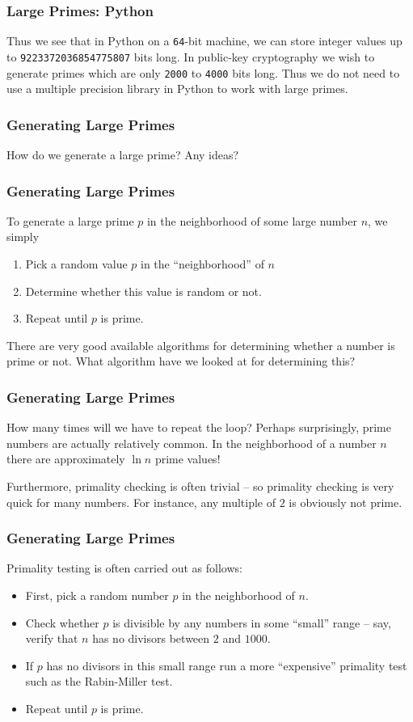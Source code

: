 \documentclass{beamer}
\newcommand{\<}{\langle}
\renewcommand{\>}{\rangle}
\begin{document}
\begin{frame}[fragile]
\frametitle{Large Primes: Python}

Thus we see that in Python on a \verb|64|-bit machine, we can store integer values up to \verb|9223372036854775807| bits long. In public-key cryptography we wish to generate primes which are only \verb|2000| to \verb|4000| bits long. Thus we do not need to use a multiple precision library in Python to work with large primes. 
\end{frame}


\begin{frame}
\frametitle{Generating Large Primes}

How do we generate a large prime? Any ideas?
\end{frame}


\begin{frame}
\frametitle{Generating Large Primes}

To generate a large prime $p$ in the neighborhood of some large number $n$, we simply 
\begin{enumerate}[Step 1:]
\item Pick a random value $p$ in the ``neighborhood'' of $n$
\item Determine whether this value is random or not.
\item Repeat until $p$ is prime. 
\end{enumerate}

There are very good available algorithms for determining whether a number is prime or not. What algorithm have we looked at for determining this?
\end{frame}


\begin{frame}[fragile]
\frametitle{Generating Large Primes}

How many times will we have to repeat the loop? Perhaps surprisingly, prime numbers are actually relatively common. In the neighborhood of a number $n$ there are approximately $\ln n$ prime values! \newline

Furthermore, primality checking is often trivial -- so primality checking is very quick for many numbers. For instance, any multiple of $2$ is obviously not prime. 
\end{frame}

\begin{frame}
\frametitle{Generating Large Primes}

Primality testing is often carried out as follows:
\begin{itemize}
\item First, pick a random number $p$ in the neighborhood of $n$. 
\item Check whether $p$ is divisible by any numbers in some ``small'' range -- say, verify that $n$ has no divisors between $2$ and $1000$.
\item If $p$ has no divisors in this small range run a more ``expensive'' primality test such as the Rabin-Miller test.
\item Repeat until $p$ is prime. 
\end{itemize}
\end{frame}
\end{document}
